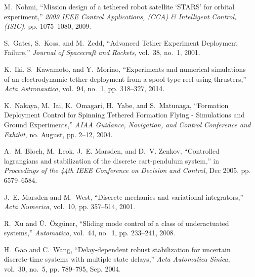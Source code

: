 \documentclass[10pt,final,journal]{IEEEtran}
\begin{document}
\begin{thebibliography}{10}
	M.~Nohmi, ``{Mission design of a tethered robot satellite `STARS' for orbital
		experiment},'' \emph{2009 IEEE Control Applications, (CCA) {\&} Intelligent
		Control, (ISIC)}, pp. 1075--1080, 2009.
	
	S.~Gates, S.~Koss, and M.~Zedd, ``{Advanced Tether Experiment Deployment
		Failure},'' \emph{Journal of Spacecraft and Rockets}, vol.~38, no.~1, 2001.
	
	K.~Iki, S.~Kawamoto, and Y.~Morino, ``{Experiments and numerical simulations of
		an electrodynamic tether deployment from a spool-type reel using
		thrusters},'' \emph{Acta Astronautica}, vol.~94, no.~1, pp. 318--327, 2014.
	
	K.~Nakaya, M.~Iai, K.~Omagari, H.~Yabe, and S.~Matunaga, ``{Formation
		Deployment Control for Spinning Tethered Formation Flying - Simulations and
		Ground Experiments},'' \emph{AIAA Guidance, Navigation, and Control
		Conference and Exhibit}, no. August, pp. 2--12, 2004.
	
	A.~M. Bloch, M.~Leok, J.~E. Marsden, and D.~V. Zenkov, ``Controlled lagrangians
		and stabilization of the discrete cart-pendulum system,'' in
		\emph{Proceedings of the 44th IEEE Conference on Decision and Control}, Dec
		2005, pp. 6579--6584.
	
	J.~E. Marsden and M.~West, ``Discrete mechanics and variational integrators,''
		\emph{Acta Numerica}, vol.~10, pp. 357--514, 2001.
	
	R.~Xu and {\"{U}}.~{\"{O}}zg{\"{u}}ner, ``{Sliding mode control of a class of
		underactuated systems},'' \emph{Automatica}, vol.~44, no.~1, pp. 233--241,
		2008.
	
	H.~Gao and C.~Wang, ``Delay-dependent robust stabilization for uncertain
		discrete-time systems with multiple state delays,'' \emph{Acta Automatica
		Sinica}, vol.~30, no.~5, pp. 789--795, Sep. 2004.
	
	\end{thebibliography}
	
%

\end{document}
